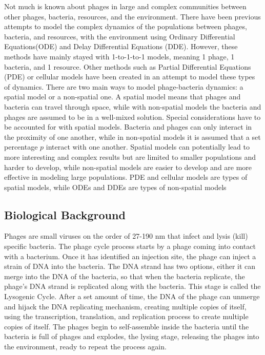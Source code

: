 Not much is known about phages in large and complex communities between other phages, bacteria, resources, and the environment. There have been previous attempts to model the complex dynamics of the populations between phages, bacteria, and resources, with the environment using Ordinary Differential Equations(ODE) and Delay Differential Equations (DDE). However, these methods have mainly stayed with 1-to-1-to-1 models, meaning 1 phage, 1 bacteria, and 1 resource. Other methods such as Partial Differential Equations (PDE) or cellular models have been created in an attempt to model these types of dynamics. There are two main ways to model phage-bacteria dynamics: a spatial model or a non-spatial one. A spatial model means that phages and bacteria can travel through space, while with non-spatial models the bacteria and phages are assumed to be in a well-mixed solution. Special considerations have to be accounted for with spatial models. Bacteria and phages can only interact in the proximity of one another, while in non-spatial models it is assumed that a set percentage $p$ interact with one another. Spatial models can potentially lead to more interesting and complex results but are limited to smaller populations and harder to develop, while non-spatial models are easier to develop and are more effective in modeling large populations. PDE and cellular models are types of spatial models, while ODEs and DDEs are types of non-spatial models \newline 

\subsection{Biological Background}
Phages are small viruses on the order of 27-190 nm that infect and lysis (kill) specific bacteria. The phage cycle process starts by a phage coming into contact with a bacterium. Once it has identified an injection site, the phage can inject a strain of DNA into the bacteria. The DNA strand has two options, either it can merge into the DNA of the bacteria, so that when the bacteria replicate, the phage's DNA strand is replicated along with the bacteria. This stage is called the Lysogenic Cycle. After a set amount of time, the DNA of the phage can unmerge and hijack the DNA replicating mechanism, creating multiple copies of itself, using the transcription, translation, and replication process to create multiple copies of itself. The phages begin to self-assemble inside the bacteria until the bacteria is full of phages and explodes, the lysing stage, releasing the phages into the environment, ready to repeat the process again. 


